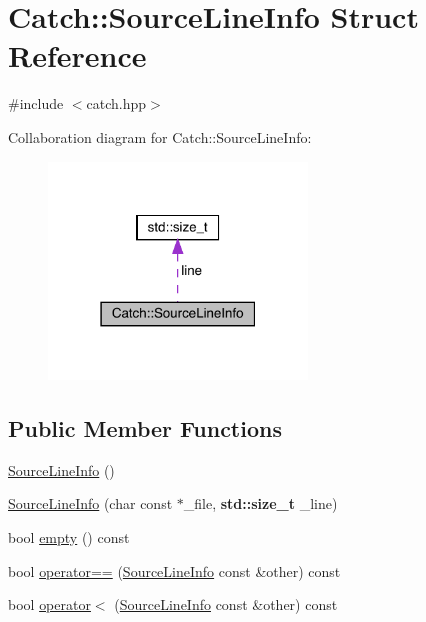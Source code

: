 \hypertarget{struct_catch_1_1_source_line_info}{}\section{Catch\+:\+:Source\+Line\+Info Struct Reference}
\label{struct_catch_1_1_source_line_info}


{\ttfamily \#include $<$catch.\+hpp$>$}



Collaboration diagram for Catch\+:\+:Source\+Line\+Info\+:
\nopagebreak
\begin{figure}[H]
\begin{center}
\leavevmode
\includegraphics[width=195pt]{struct_catch_1_1_source_line_info__coll__graph}
\end{center}
\end{figure}
\subsection*{Public Member Functions}
\begin{DoxyCompactItemize}
\item 
\hyperlink{struct_catch_1_1_source_line_info_a9d44b2e1133794eee0bd5716424c83d6}{Source\+Line\+Info} ()
\item 
\hyperlink{struct_catch_1_1_source_line_info_a6218cb890337d37f708ea94063958940}{Source\+Line\+Info} (char const $\ast$\+\_\+file, \textbf{ std\+::size\+\_\+t} \+\_\+line)
\item 
bool \hyperlink{struct_catch_1_1_source_line_info_a05ab6444e9de7e9c3e76d8aa00093c3a}{empty} () const
\item 
bool \hyperlink{struct_catch_1_1_source_line_info_a688e761986879266658f000f14ab8a42}{operator==} (\hyperlink{struct_catch_1_1_source_line_info}{Source\+Line\+Info} const \&other) const
\item 
bool \hyperlink{struct_catch_1_1_source_line_info_a8b99a0d7b1553d8c2298c694db924be3}{operator$<$} (\hyperlink{struct_catch_1_1_source_line_info}{Source\+Line\+Info} const \&other) const
\end{DoxyCompactItemize}
